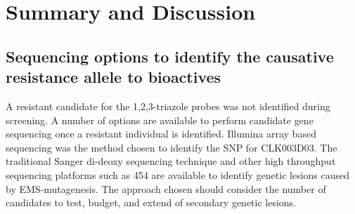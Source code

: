 \section{Summary and Discussion}



\subsection{Sequencing options to identify the causative resistance allele to bioactives}

A resistant candidate for the 1,2,3-triazole probes was not identified during screening. A number of options are available to perform candidate gene sequencing once a resistant individual is identified. Illumina array based sequencing \cite{ossowski2010rate} was the method chosen to identify the SNP for CLK003D03.  The traditional Sanger di-deoxy sequencing technique \cite{bentley2008accurate} and other high throughput sequencing platforms such as 454 are available to identify genetic lesions caused by EMS-mutagenesis. The approach chosen should consider the number of candidates to test, budget, and extend of secondary genetic lesions.

